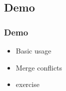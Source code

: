     \subsection{Demo}
    \begin{frame} 
		\frametitle{Demo}
        \begin{itemize}
        	\item Basic usage
            \item Merge conflicts
            \item exercise
        \end{itemize}
	\end{frame}

